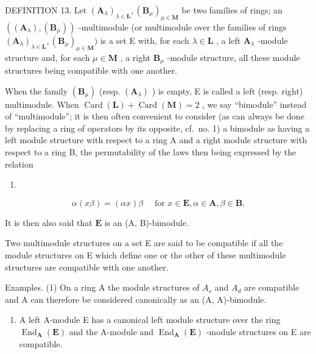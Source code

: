 DEFINITION 13. Let \((\mathbf{A}_{\lambda})_{\lambda \in \mathbf{L}}, (\mathbf{B}_{\mu})_{\mu \in \mathbf{M}}\) be two families of rings; an \(((\mathbf{A}_{\lambda}), (\mathbf{B}_{\mu}))\) -multimodule (or multimodule over the families of rings \((\mathbf{A}_{\lambda})_{\lambda \in \mathbf{L}}, (\mathbf{B}_{\mu})_{\mu \in \mathbf{M}})\) is a set E with, for each \(\lambda \in \mathbf{L}\) , a left \(\mathbf{A}_{\lambda}\) -module structure and, for each \(\mu \in \mathbf{M}\) , a right \(\mathbf{B}_{\mu}\) -module structure, all these module structures being compatible with one another.

When the family \((\mathbf{B}_{\mu})\) (resp. \((\mathbf{A}_{\lambda})\) ) is empty, E is called a left (resp. right) multimodule. When \(\operatorname{Card}(\mathbf{L}) + \operatorname{Card}(\mathbf{M}) = 2\) , we say ``bimodule'' instead of ``multimodule''; it is then often convenient to consider (as can always be done by replacing a ring of operators by its opposite, cf.~no. 1) a bimodule as having a left module structure with respect to a ring A and a right module structure with respect to a ring B, the permutability of the laws then being expressed by the relation

\begin{enumerate}
\def\labelenumi{(\arabic{enumi})}
\setcounter{enumi}{48}
\tightlist
\item
\end{enumerate}

\[
\alpha (x \beta) = (\alpha x) \beta \quad \text { for } x \in \mathbf {E}, \alpha \in \mathbf {A}, \beta \in \mathbf {B}.
\]

It is then also said that \(\mathbf{E}\) is an (A, B)-bimodule.

Two multimodule structures on a set E are said to be compatible if all the module structures on E which define one or the other of these multimodule structures are compatible with one another.

Examples. (1) On a ring A the module structures of \(A_{s}\) and \(A_{d}\) are compatible and A can therefore be considered canonically as an (A, A)-bimodule.

\begin{enumerate}
\def\labelenumi{(\arabic{enumi})}
\setcounter{enumi}{1}
\tightlist
\item
  A left A-module E has a canonical left module structure over the ring \(\operatorname{End}_{\mathbf{A}}(\mathbf{E})\) and the A-module and \(\operatorname{End}_{\mathbf{A}}(\mathbf{E})\) -module structures on E are compatible.
\end{enumerate}

